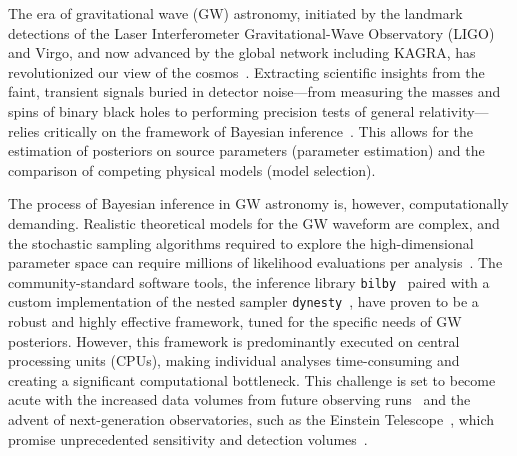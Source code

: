 \documentclass[fleqn,usenatbib]{mnras}
\begin{document}


The era of gravitational wave (GW) astronomy, initiated by the landmark
detections of the Laser Interferometer Gravitational-Wave Observatory (LIGO) and
Virgo, and now advanced by the global network including KAGRA, has revolutionized
our view of the cosmos~\citep{GW150914, GW170817,GWTC1,GWTC2, GWTC3,GWTC3_pop_analysis,GWTC2_GR,siren}. 
Extracting scientific insights from the faint, transient signals buried in detector noise—from measuring the
masses and spins of binary black holes to performing precision tests of general
relativity—relies critically on the framework of Bayesian inference~\citep{Thrane_2019}. 
This allows for the estimation of posteriors on source parameters
(parameter estimation) and the comparison of competing physical models (model selection).

The process of Bayesian inference in GW astronomy is, however, computationally
demanding. Realistic theoretical models for the GW waveform are complex, and the
stochastic sampling algorithms required to explore the high-dimensional parameter
space can require millions of likelihood evaluations per analysis~\citep{LIGO_guide_signalextraction}.
The community-standard software tools, the inference library \texttt{bilby}~\citep{bilby_paper}
paired with a custom implementation of the nested sampler \texttt{dynesty}~\citep{dynesty}, 
have proven to be a robust and highly effective framework, tuned for the specific needs of GW posteriors.
However, this framework is predominantly executed on central processing units
(CPUs), making individual analyses time-consuming and creating a significant
computational bottleneck. This challenge is set to become acute with the
increased data volumes from future observing runs~\citep{aLIGO, aVirgo, aLVK_prospects} and the advent of
next-generation observatories, such as the Einstein Telescope~\citep{ET_science_case}, which promise
unprecedented sensitivity and detection volumes~\citep{HuAccelerationReview}.
\end{document}
